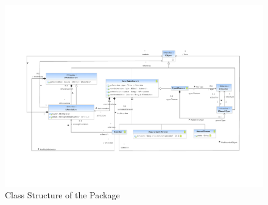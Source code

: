 %
%

\begin{figure}[htbp]
  \centering
  \includegraphics[width=\textheight,angle=90]{figures/A_technical-reference/packages/core/core}
  \caption{Class Structure of the  Package}
  \label{fig:MM:modeling}
\end{figure}
